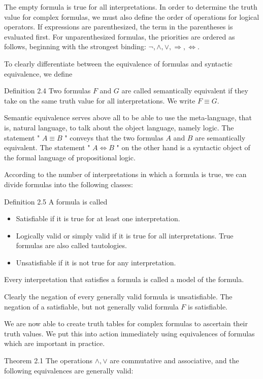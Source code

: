 \documentclass[10pt]{book}
\begin{document}
The empty formula is true for all interpretations. In order to determine the truth value for complex formulas, we must also define the order of operations for logical operators. If expressions are parenthesized, the term in the parentheses is evaluated first. For unparenthesized formulas, the priorities are ordered as follows, beginning with the strongest binding: $\neg, \wedge, \vee, \Rightarrow, \Leftrightarrow$.

To clearly differentiate between the equivalence of formulas and syntactic equivalence, we define

Definition 2.4 Two formulas $F$ and $G$ are called semantically equivalent if they take on the same truth value for all interpretations. We write $F \equiv G$.

Semantic equivalence serves above all to be able to use the meta-language, that is, natural language, to talk about the object language, namely logic. The statement " $A \equiv B$ " conveys that the two formulas $A$ and $B$ are semantically equivalent. The statement " $A \Leftrightarrow B$ " on the other hand is a syntactic object of the formal language of propositional logic.

According to the number of interpretations in which a formula is true, we can divide formulas into the following classes:

Definition 2.5 A formula is called

\begin{itemize}
  \item Satisfiable if it is true for at least one interpretation.
  \item Logically valid or simply valid if it is true for all interpretations. True formulas are also called tautologies.
  \item Unsatisfiable if it is not true for any interpretation.
\end{itemize}

Every interpretation that satisfies a formula is called a model of the formula.

Clearly the negation of every generally valid formula is unsatisfiable. The negation of a satisfiable, but not generally valid formula $F$ is satisfiable.

We are now able to create truth tables for complex formulas to ascertain their truth values. We put this into action immediately using equivalences of formulas which are important in practice.

Theorem 2.1 The operations $\wedge, \vee$ are commutative and associative, and the following equivalences are generally valid:
\end{document}
